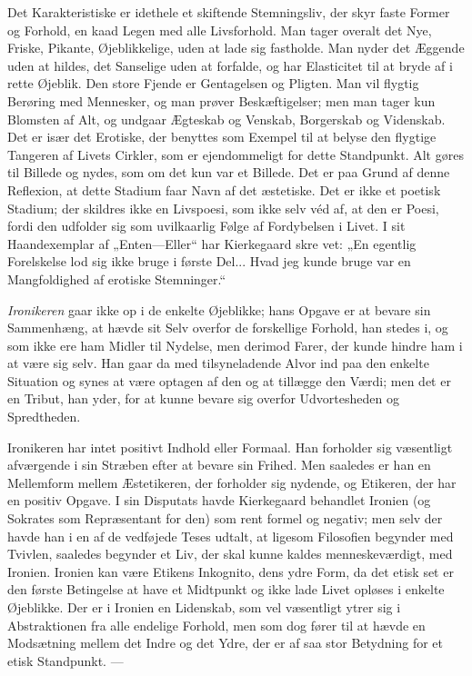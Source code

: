 \documentclass[12pt,a4paper,openany]{book}
\newcommand{\opage}[1]{\marginnote{\footnotesize\textit{[#1]}}}
\begin{document}
Det Karakteristiske er idethele et skiftende Stemningsliv, der skyr faste
Former og Forhold, en kaad Legen med alle Livsforhold. Man tager overalt det
Nye, Friske, Pikante, Øjeblikkelige, uden at lade sig fastholde. Man nyder det
Æggende uden at hildes, det Sanselige uden at forfalde, og har Elasticitet til
at bryde af i rette Øjeblik. Den store Fjende er Gentagelsen og Pligten. Man
vil flygtig Berøring med Mennesker, og man prøver Beskæftigelser; men man tager
kun Blomsten af Alt, og undgaar Ægteskab og Venskab, Borgerskab og Videnskab.
Det er især det Erotiske, der benyttes som Exempel til at belyse den flygtige
Tangeren af Livets Cirkler, som er ejendommeligt for dette Standpunkt. Alt
gøres til Billede og nydes, som om det kun var et Billede. Det er paa Grund af
denne Reflexion, at dette Stadium faar Navn af det æstetiske. Det er ikke et
poetisk Stadium; der skildres ikke en Livspoesi, som ikke selv véd af, at den
er Poesi, fordi den udfolder sig som uvilkaarlig Følge af Fordybelsen i Livet.
I sit Haandexemplar af „Enten---Eller“ har Kierkegaard skre%
\setcounter{footnote}{0}%
\opage{158}vet: „En egentlig Forelskelse lod sig ikke bruge i første Del...
Hvad jeg kunde bruge var en Mangfoldighed af erotiske Stemninger.“

\textit{Ironikeren} gaar ikke op i de enkelte Øjeblikke; hans Opgave er at
bevare sin Sammenhæng, at hævde sit Selv overfor de forskellige Forhold, han
stedes i, og som ikke ere ham Midler til Nydelse, men derimod Farer, der kunde
hindre ham i at være sig selv. Han gaar da med tilsyneladende Alvor ind paa den
enkelte Situation og synes at være optagen af den og at tillægge den Værdi; men
det er en Tribut, han yder, for at kunne bevare sig overfor Udvortesheden og
Spredtheden.

Ironikeren har intet positivt Indhold eller Formaal. Han forholder sig
væsentligt afværgende i sin Stræben efter at bevare sin Frihed. Men saaledes er
han en Mellemform mellem Æstetikeren, der forholder sig nydende, og Etikeren,
der har en positiv Opgave. I sin Disputats havde Kierkegaard behandlet Ironien
(og Sokrates som Repræsentant for den) som rent formel og negativ; men selv der
havde han i en af de vedføjede Teses udtalt, at ligesom Filosofien begynder med
Tvivlen, saaledes begynder et Liv, der skal kunne kaldes menneskeværdigt, med
Ironien. Ironien kan være Etikens Inkognito, dens ydre Form, da det etisk set
er den første Betingelse at have et Midtpunkt og ikke lade Livet opløses i
enkelte Øjeblikke. Der er i Ironien en Lidenskab, som vel væsentligt ytrer sig
i Abstraktionen fra alle endelige Forhold, men som dog fører til at hævde en
Modsætning mellem det Indre og det Ydre, der er af saa stor Betydning for et
etisk Standpunkt. ---
\end{document}
